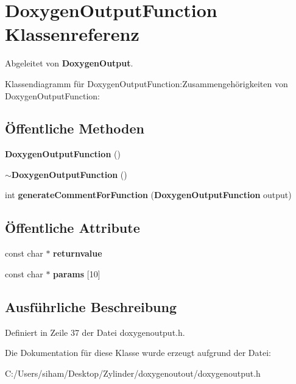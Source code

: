 \section{Doxygen\-Output\-Function Klassenreferenz}
\label{class_doxygen_output_function}
Abgeleitet von {\bf Doxygen\-Output}.

Klassendiagramm f\"{u}r Doxygen\-Output\-Function:Zusammengeh\"{o}rigkeiten von Doxygen\-Output\-Function:\subsection*{\"{O}ffentliche Methoden}
\begin{CompactItemize}
\item 
{\bf Doxygen\-Output\-Function} ()\label{class_doxygen_output_function_0185233fca3db8d1d70ad454ec84f102}

\item 
{\bf $\sim$Doxygen\-Output\-Function} ()\label{class_doxygen_output_function_d680823798c47a29c61c41c1c85e517a}

\item 
int {\bf generate\-Comment\-For\-Function} ({\bf Doxygen\-Output\-Function} output)\label{class_doxygen_output_function_b2ded7e44d321028690fe3524fc02c51}

\end{CompactItemize}
\subsection*{\"{O}ffentliche Attribute}
\begin{CompactItemize}
\item 
const char $\ast$ {\bf returnvalue}\label{class_doxygen_output_function_26e2353adefd4a498e46d9d8ac09a78a}

\item 
const char $\ast$ {\bf params} [10]\label{class_doxygen_output_function_65f7e9f880d800fcfc0a31a2c8ba9c2b}

\end{CompactItemize}


\subsection{Ausf\"{u}hrliche Beschreibung}




Definiert in Zeile 37 der Datei doxygenoutput.h.

Die Dokumentation f\"{u}r diese Klasse wurde erzeugt aufgrund der Datei:\begin{CompactItemize}
\item 
C:/Users/siham/Desktop/Zylinder/doxygenoutout/doxygenoutput.h\end{CompactItemize}
